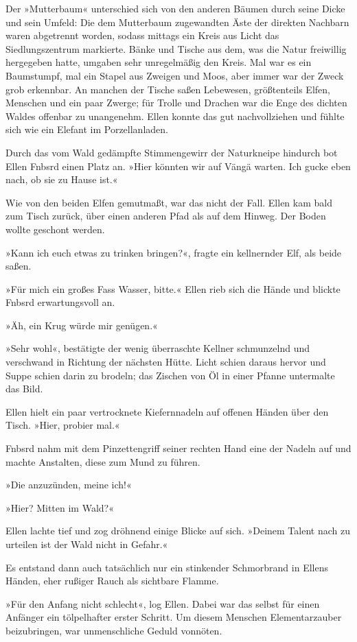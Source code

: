 Der »Mutterbaum« unterschied sich von den anderen Bäumen durch seine Dicke und sein Umfeld: Die dem Mutterbaum zugewandten Äste der direkten Nachbarn waren abgetrennt worden, sodass mittags ein Kreis aus Licht das Siedlungszentrum markierte. Bänke und Tische aus dem, was die Natur freiwillig hergegeben hatte, umgaben sehr unregelmäßig den Kreis. Mal war es ein Baumstumpf, mal ein Stapel aus Zweigen und Moos, aber immer war der Zweck grob erkennbar. An manchen der Tische saßen Lebewesen, größtenteils Elfen, Menschen und ein paar Zwerge; für Trolle und Drachen war die Enge des dichten Waldes offenbar zu unangenehm. Ellen konnte das gut nachvollziehen und fühlte sich wie ein Elefant im Porzellanladen.

Durch das vom Wald gedämpfte Stimmengewirr der Naturkneipe hindurch bot Ellen Fnbsrd einen Platz an. »Hier könnten wir auf Vängä warten. Ich gucke eben nach, ob sie zu Hause ist.«

Wie von den beiden Elfen gemutmaßt, war das nicht der Fall. Ellen kam bald zum Tisch zurück, über einen anderen Pfad als auf dem Hinweg. Der Boden wollte geschont werden.

»Kann ich euch etwas zu trinken bringen?«, fragte ein kellnernder Elf, als beide saßen.

»Für mich ein großes Fass Wasser, bitte.« Ellen rieb sich die Hände und blickte Fnbsrd erwartungsvoll an.

»Äh, ein Krug würde mir genügen.«

»Sehr wohl«, bestätigte der wenig überraschte Kellner schmunzelnd und verschwand in Richtung der nächsten Hütte. Licht schien daraus hervor und Suppe schien darin zu brodeln; das Zischen von Öl in einer Pfanne untermalte das Bild.

Ellen hielt ein paar vertrocknete Kiefernnadeln auf offenen Händen über den Tisch. »Hier, probier mal.«

Fnbsrd nahm mit dem Pinzettengriff seiner rechten Hand eine der Nadeln auf und machte Anstalten, diese zum Mund zu führen.

»Die anzuzünden, meine ich!«

»Hier? Mitten im Wald?«

Ellen lachte tief und zog dröhnend einige Blicke auf sich. »Deinem Talent nach zu urteilen ist der Wald nicht in Gefahr.«

Es entstand dann auch tatsächlich nur ein stinkender Schmorbrand in Ellens Händen, eher rußiger Rauch als sichtbare Flamme.

»Für den Anfang nicht schlecht«, log Ellen. Dabei war das selbst für einen Anfänger ein tölpelhafter erster Schritt. Um diesem Menschen Elementarzauber beizubringen, war unmenschliche Geduld vonnöten.

